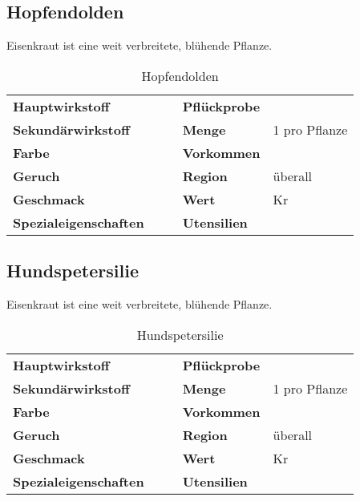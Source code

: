 \subsection{Hopfendolden}
Eisenkraut ist eine weit verbreitete, blühende Pflanze. 

\begin{table}[h]
\begin{center}
\begin{tabular}{|l|l|p{1cm}|l|l|}
	\cline{1-2} \cline{4-5}
	\textbf{Hauptwirkstoff} &  && \textbf{Pflückprobe} &  \\ \cline{1-2} \cline{4-5}
	\textbf{Sekundärwirkstoff} &  && \textbf{Menge} & 1 pro Pflanze \\ \cline{1-2} \cline{4-5}
	\textbf{Farbe} &  && \textbf{Vorkommen} &  \\ \cline{1-2} \cline{4-5}
	\textbf{Geruch} &  && \textbf{Region} & überall \\ \cline{1-2} \cline{4-5}
	\textbf{Geschmack} &  && \textbf{Wert} & Kr \\ \cline{1-2} \cline{4-5}
	\textbf{Spezialeigenschaften} &  && \textbf{Utensilien} &  \\ \cline{1-2} \cline{4-5}
\end{tabular}
\end{center}
\caption{Hopfendolden}
\label{tab:hopfendolden}
\end{table}


\subsection{Hundspetersilie}
Eisenkraut ist eine weit verbreitete, blühende Pflanze. 

\begin{table}[h]
\begin{center}
\begin{tabular}{|l|l|p{1cm}|l|l|}
	\cline{1-2} \cline{4-5}
	\textbf{Hauptwirkstoff} &  && \textbf{Pflückprobe} &  \\ \cline{1-2} \cline{4-5}
	\textbf{Sekundärwirkstoff} &  && \textbf{Menge} & 1 pro Pflanze \\ \cline{1-2} \cline{4-5}
	\textbf{Farbe} &  && \textbf{Vorkommen} &  \\ \cline{1-2} \cline{4-5}
	\textbf{Geruch} &  && \textbf{Region} & überall \\ \cline{1-2} \cline{4-5}
	\textbf{Geschmack} &  && \textbf{Wert} & Kr \\ \cline{1-2} \cline{4-5}
	\textbf{Spezialeigenschaften} &  && \textbf{Utensilien} &  \\ \cline{1-2} \cline{4-5}
\end{tabular}
\end{center}
\caption{Hundspetersilie}
\label{tab:hundspetersilie}
\end{table}


